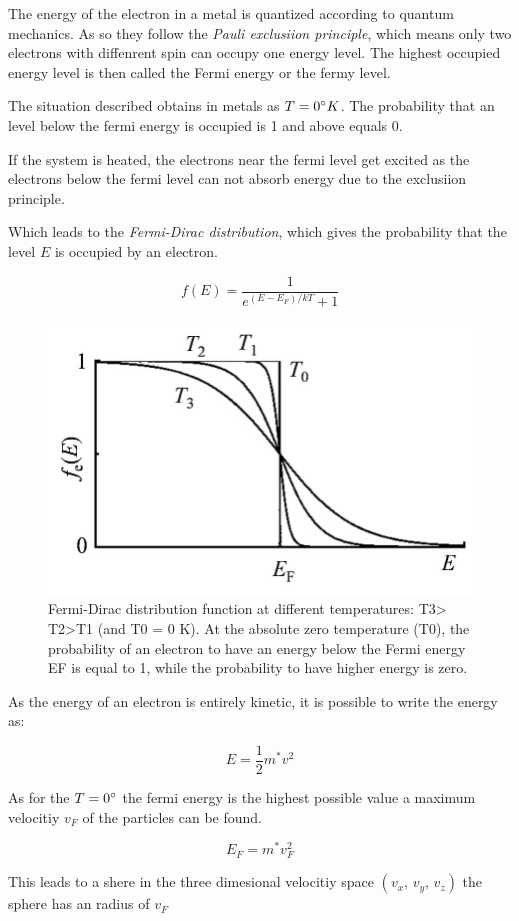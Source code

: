 The energy of the electron in a metal is quantized according to quantum mechanics.
As so they follow the \textit{Pauli exclusiion principle}, which means only two 
electrons with diffenrent spin can occupy one energy level.
The highest occupied energy level is then called the Fermi energy or the fermy
level.

The situation described obtains in metals as $T=0 \degree K$. The probability that 
an level below the fermi energy is occupied is 1 and above equals 0.

If the system is heated, the electrons near the fermi level get excited as 
the electrons below the fermi level can not absorb energy due to the exclusiion
principle.

Which leads to the \textit{Fermi-Dirac distribution}, which gives
the probability that the level $E$ is occupied by an electron.

\begin{equation}
    f(E) = \frac{1}{e^{(E-E_F)/kT}+1}
\end{equation}

\begin{figure}[H]
    \centering
    \includegraphics[width=0.5\linewidth]{Graphics/Chapter1/Fermi-Dirac-distribution.png}
    \caption{Fermi-Dirac distribution function at different temperatures: T3> T2>T1
     (and T0 = 0 K). At the absolute zero temperature (T0), the probability of an 
     electron to have an energy below the Fermi energy EF is equal to 1, while the 
     probability to have higher energy is zero.}
    \label{}
\end{figure}

As the energy of an electron is entirely kinetic, it is possible
to write the energy as:

$$E = \frac{1}{2} m^* v^2$$

As for the $T=0 \degree$ the fermi energy is the highest possible value
a maximum velocitiy $v_F$ of the particles can be found. 

$$E_F = m^*v_F^2$$

This leads to a shere in the three dimesional velocitiy space
$(v_x, \, v_y, \, v_z)$ the sphere has an radius of $v_F$


